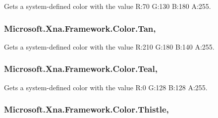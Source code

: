 Gets a system-\/defined color with the value R\+:70 G\+:130 B\+:180 A\+:255.

\hypertarget{struct_microsoft_1_1_xna_1_1_framework_1_1_color_a3010b3b108193484cc3c260309eb723d}{}
\subsubsection[{Tan}]{ Microsoft.\+Xna.\+Framework.\+Color.\+Tan\hspace{0.3cm}{\ttfamily [static]}, {\ttfamily [get]}}\label{struct_microsoft_1_1_xna_1_1_framework_1_1_color_a3010b3b108193484cc3c260309eb723d}


Gets a system-\/defined color with the value R\+:210 G\+:180 B\+:140 A\+:255.

\hypertarget{struct_microsoft_1_1_xna_1_1_framework_1_1_color_a2002b35d79304a452a1d6479027bd7ca}{}
\subsubsection[{Teal}]{ Microsoft.\+Xna.\+Framework.\+Color.\+Teal\hspace{0.3cm}{\ttfamily [static]}, {\ttfamily [get]}}\label{struct_microsoft_1_1_xna_1_1_framework_1_1_color_a2002b35d79304a452a1d6479027bd7ca}


Gets a system-\/defined color with the value R\+:0 G\+:128 B\+:128 A\+:255.

\hypertarget{struct_microsoft_1_1_xna_1_1_framework_1_1_color_ae414b46eefc7d14f649fc2a4f8a286d7}{}
\subsubsection[{Thistle}]{ Microsoft.\+Xna.\+Framework.\+Color.\+Thistle\hspace{0.3cm}{\ttfamily [static]}, {\ttfamily [get]}}\label{struct_microsoft_1_1_xna_1_1_framework_1_1_color_ae414b46eefc7d14f649fc2a4f8a286d7}


